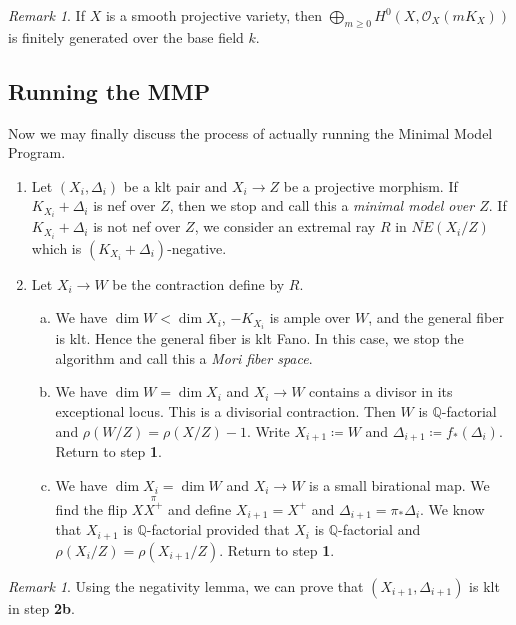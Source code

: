 \documentclass[leqno, openany]{memoir}
\theoremstyle{definition}
\theoremstyle{remark}
\newtheorem{rmk}[thm]{Remark}
\theoremstyle{plain}
\theoremstyle{definition}
\theoremstyle{remark}
\newcommand{\Q}{\mathbb{Q}}
\newcommand{\msc}[1]{\mathscr{#1}}
\newcommand{\ol}[1]{\overline{#1}}
\begin{document}
\begin{rmk}
    If $X$ is a smooth projective variety, then $\bigoplus_{m \geq 0} H^0(X, \msc{O}_X(mK_X))$ is finitely generated over the base field $k$.
\end{rmk}

\subsection{Running the MMP}%
\label{sub:running_the_mmp}

Now we may finally discuss the process of actually running the Minimal Model Program.

\begin{enumerate}
    \item Let $(X_i, \Delta_i)$ be a klt pair and $X_i \to Z$ be a projective morphism. If $K_{X_i} + \Delta_i$ is nef over $Z$, then we stop and call this a \textit{minimal model over $Z$}. If $K_{X_i} + \Delta_i$ is not nef over $Z$, we consider an extremal ray $R$ in $\ol{NE}(X_i / Z)$ which is $(K_{X_i} + \Delta_i)$-negative.
    \item Let $X_i \to W$ be the contraction define by $R$.
        \begin{enumerate}[(a)]
            \item We have $\dim W < \dim X_i$, $-K_{X_i}$ is ample over $W$, and the general fiber is klt. Hence the general fiber is klt Fano. In this case, we stop the algorithm and call this a \textit{Mori fiber space}.
            \item We have $\dim W = \dim X_i$ and $X_i \to W$ contains a divisor in its exceptional locus. This is a divisorial contraction. Then $W$ is $\Q$-factorial and $\rho(W/Z) = \rho(X/Z) - 1$. Write $X_{i+1} \coloneqq W$ and $\Delta_{i+1} \coloneqq f_*(\Delta_i)$. Return to step \textbf{1}.
            \item We have $\dim X_i = \dim W$ and $X_i \to W$ is a small birational map. We find the flip $X \overset{\pi}{X^+}$ and define $X_{i+1} = X^+$ and $\Delta_{i+1} = \pi_* \Delta_i$. We know that $X_{i+1}$ is $\Q$-factorial provided that $X_i$ is $\Q$-factorial and $\rho(X_i/Z) = \rho(X_{i+1}/Z)$. Return to step \textbf{1}.
        \end{enumerate}
\end{enumerate}

\begin{rmk}
    Using the negativity lemma, we can prove that $(X_{i+1}, \Delta_{i+1})$ is klt in step \textbf{2b}.
\end{rmk}
\end{document}

